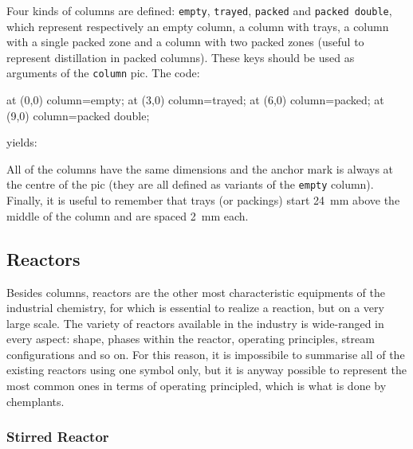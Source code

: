 \documentclass[12pt]{article}						%
\newcommand*{\chpp}[1]{\texttt{#1}}				%
\newcommand*{\chpa}[1]{\texttt{#1}}				%
\newcommand*{\chemplants}{chemplants}
\begin{document}
Four kinds of columns are defined: \chpa{empty}, \chpa{trayed}, \chpa{packed}
and \chpa{packed double}, which represent respectively an empty column, a column
with trays, a column with a single packed zone and a column with two packed
zones (useful to represent distillation in packed columns). These keys should be
used as arguments of the \chpp{column} pic. The code:
\begin{chpcode}
	\pic at (0,0) {column=empty};
	\pic at (3,0) {column=trayed};
	\pic at (6,0) {column=packed};
	\pic at (9,0) {column=packed double};
\end{chpcode}
yields:
\begin{center}
\end{center}
All of the columns have the same dimensions and the anchor mark is always at the
centre of the pic (they are all defined as variants of the \chpa{empty} column).
Finally, it is useful to remember that trays (or packings) start \SI{24}{\mm}
above the middle of the column and are spaced \SI{2}{\mm} each.

\subsection{Reactors}

Besides columns, reactors are the other most characteristic equipments of the
industrial chemistry, for which is essential to realize a reaction, but on a
very large scale. The variety of reactors available in the industry is
wide-ranged in every aspect: shape, phases within the reactor, operating
principles, stream configurations and so on. For this reason, it is impossibile
to summarise all of the existing reactors using one symbol only, but it is anyway
possible to represent the most common ones in terms of operating principled,
which is what is done by \chemplants.

\subsubsection{Stirred Reactor}
\end{document}
